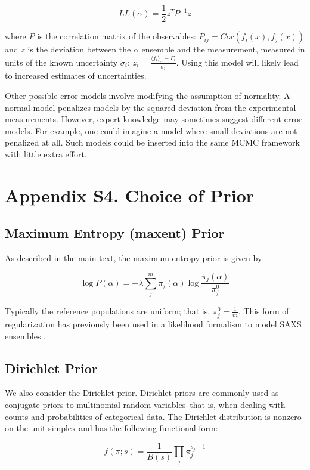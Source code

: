 \documentclass[12pt]{article}
\begin{document}
$$L L(\alpha) = \frac{1}{2} z^T P^{-1} z$$

where $P$ is the correlation matrix of the observables: $P_{ij} = Cor(f_i(x), f_j(x))$ and $z$ is the deviation between the $\alpha$ ensemble and the measurement, measured in units of the known uncertainty $\sigma_i$: $z_i = \frac{\langle f_i\rangle _\alpha - F_i}{\sigma_i}$.  Using this model will likely lead to increased estimates of uncertainties.  

Other possible error models involve modifying the assumption of normality.  A normal model penalizes models by the squared deviation from the experimental measurements.  However, expert knowledge may sometimes suggest different error models.  For example, one could imagine a model where small deviations are not penalized at all.  Such models could be inserted into the same MCMC framework with little extra effort.

\newpage

\section*{Appendix S4.  Choice of Prior}

\subsection*{Maximum Entropy (maxent) Prior}

As described in the main text, the maximum entropy prior is given by 

$$\log P(\alpha) = -\lambda \sum_j^m \pi_j(\alpha) \log \frac{\pi_j(\alpha)}{\pi_j^0}$$

Typically the reference populations are uniform; that is, $\pi_j^0 = \frac{1}{m}$.  This form of regularization has previously been used in a likelihood formalism to model SAXS ensembles \cite{rozycki2011saxs}.  

\subsection*{Dirichlet Prior}

We also consider the Dirichlet prior.  Dirichlet priors are commonly used as conjugate priors to multinomial random variables--that is, when dealing with counts and probabilities of categorical data.  The Dirichlet distribution is nonzero on the unit simplex and has the following functional form:

$$f(\pi;s) = \frac{1}{B(s)} \prod_j \pi_j^{s_j - 1}$$
\end{document}
